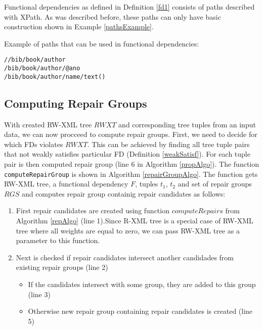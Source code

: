 Functional dependencies as defined in Definition \ref{fd1} consists of paths described with XPath. As was described before, these paths can only have basic construction shown in Example \ref{pathsExample}.

\begin{example}\label{pathsExample}
Example of paths that can be used in functional dependencies:
\begin{verbatim}
//bib/book/author
/bib/book/author/@ano
/bib/book/author/name/text()
\end{verbatim}
\end{example}

\subsection{Computing Repair Groups}

With created RW-XML tree $RWXT$ and corresponding tree tuples from an input data, we can now procceed to compute repair groups. First, we need to decide for which FDs violates $RWXT$. This can be achieved by finding all tree tuple pairs that not weakly satisfies particular FD (Definition \ref{weakSatisf}). For each tuple pair is then computed repair group (line 6 in Algorithm \ref{propAlgo}). The function \texttt{computeRepairGroup} is shown in Algorithm \ref{repairGroupAlgo}. The function gets RW-XML tree, a functional dependency $F$, tuples $t_1$, $t_2$ and set of repair groups $RGS$ and computes repair group containig repair candidates as follows:

\begin{enumerate}
	\item First repair candidates are created using function $computeRepairs$ from Algorithm \ref{repAlgo} (line 1).Since R-XML tree is a special case of RW-XML tree where all weights are equal to zero, we can pass RW-XML tree as a parameter to this function.
    \item Next is checked if repair candidates intersect another candidades from existing repair groups (line 2)
    \begin{itemize}
    	\item If the candidates intersect with some group, they are added to this group (line 3)
        \item Otherwise new repair group containing repair candidates is created (line 5)
    \end{itemize}
\end{enumerate}


